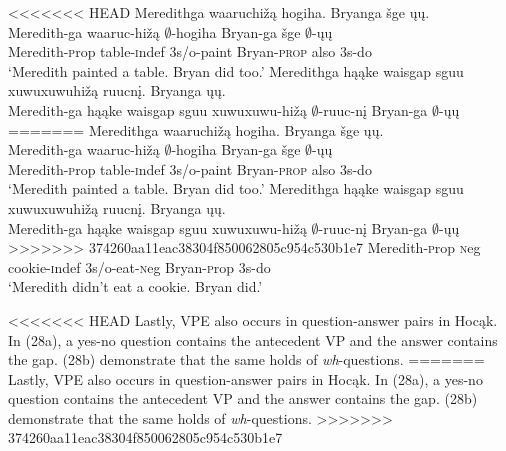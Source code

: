 \documentclass[output=paper]{LSP/langsci}
\begin{document}
\begin{exe}
\ex
\begin{xlist}
\ex
<<<<<<< HEAD
\glll Meredithga waaruchižą hogiha. Bryanga šge ųų.\\
Meredith-ga waaruc-hižą $\emptyset$-hogiha Bryan-ga šge $\emptyset$-ųų\\
Meredith-{\textsc prop} table-{\textsc indef} {\textsc 3s/o}-paint Bryan-\textsc{prop} also {\textsc 3s}-do\\
\trans `Meredith painted a table. Bryan did too.'
\ex
\glll Meredithga hąąke {waisgap sguu xuwuxuwuhižą} ruucnį. Bryanga ųų.\\
Meredith-ga hąąke {waisgap sguu xuwuxuwu-hižą} $\emptyset$-ruuc-nį Bryan-ga $\emptyset$-ųų\\
=======
\glll Meredithga waaruchi\v{z}\k{a} hogiha. Bryanga \v{s}ge \k{u}\k{u}.\\
Meredith-ga waaruc-hi\v{z}\k{a} $\emptyset$-hogiha Bryan-ga \v{s}ge $\emptyset$-\k{u}\k{u}\\
Meredith-{\textsc prop} table-{\textsc indef} {\textsc 3s/o}-paint Bryan-\textsc{prop} also {\textsc 3s}-do\\
\trans `Meredith painted a table. Bryan did too.'
\ex
\glll Meredithga h\k{a}\k{a}ke {waisgap sguu xuwuxuwuhi\v{z}\k{a}} ruucn\k{i}. Bryanga \k{u}\k{u}.\\
Meredith-ga h\k{a}\k{a}ke {waisgap sguu xuwuxuwu-hi\v{z}\k{a}} $\emptyset$-ruuc-n\k{i} Bryan-ga $\emptyset$-\k{u}\k{u}\\
>>>>>>> 374260aa11eac38304f850062805c954c530b1e7
Meredith-{\textsc prop} {\textsc neg} cookie-{\textsc indef} {\textsc 3s/o}-eat-{\textsc neg} Bryan-{\textsc prop} {\textsc 3s}-do\\
\trans `Meredith didn't eat a cookie. Bryan did.'
\end{xlist}
\end{exe}

<<<<<<< HEAD
Lastly, VPE also occurs in question-answer pairs in Hocąk. In (28a), a yes-no question contains the antecedent VP and the answer contains the gap. (28b) demonstrate that the same holds of \emph{wh}-questions.
=======
Lastly, VPE also occurs in question-answer pairs in Hoc\k{a}k. In (28a), a yes-no question contains the antecedent VP and the answer contains the gap. (28b) demonstrate that the same holds of \emph{wh}-questions.
>>>>>>> 374260aa11eac38304f850062805c954c530b1e7
\end{document}
